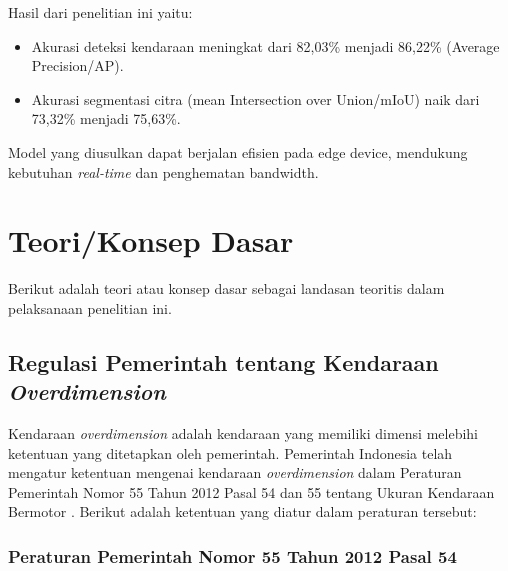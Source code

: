 Hasil dari penelitian ini yaitu:
\begin{itemize}[nolistsep]
  \item Akurasi deteksi kendaraan meningkat dari 82,03\% menjadi 86,22\% (Average Precision/AP).
  \item Akurasi segmentasi citra (mean Intersection over Union/mIoU) naik dari 73,32\% menjadi 75,63\%.
\end{itemize}
Model yang diusulkan dapat berjalan efisien pada edge device, mendukung kebutuhan \emph{real-time} dan penghematan bandwidth.

\section{Teori/Konsep Dasar}
\label{sec:teorikonsepdasar}
 Berikut adalah teori atau konsep dasar sebagai landasan teoritis dalam pelaksanaan penelitian ini.
 
\subsection{Regulasi Pemerintah tentang Kendaraan \emph{Overdimension}}

Kendaraan \emph{overdimension} adalah kendaraan yang memiliki dimensi melebihi ketentuan yang ditetapkan oleh pemerintah. Pemerintah Indonesia telah mengatur ketentuan mengenai kendaraan \emph{overdimension} dalam Peraturan Pemerintah Nomor 55 Tahun 2012 Pasal 54 dan 55 tentang Ukuran Kendaraan Bermotor \parencite*{ppno55thn2012}. Berikut adalah ketentuan yang diatur dalam peraturan tersebut:

\subsubsection{Peraturan Pemerintah Nomor 55 Tahun 2012 Pasal 54}

